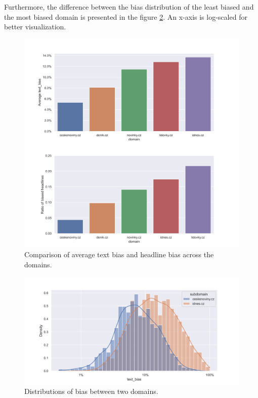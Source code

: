 Furthermore, the difference between the bias distribution of the least biased and the most biased domain is presented in the figure \ref{fig:dists_ctk_idnes}. An x-axis is log-scaled for better visualization.
\newpage


\begin{figure}

  \includegraphics[scale=0.5]{my_modules/multimedia/inference/domains.jpg}
  \caption{Comparison of average text bias and headline bias across the domains.}
  \label{fig:domains}

\end{figure}

\begin{figure}
  \includegraphics[scale=0.5]{my_modules/multimedia/inference/dists_ctk_idnes.png}
  \caption{Distributions of bias between two domains.}
  \label{fig:dists_ctk_idnes}
\end{figure}








